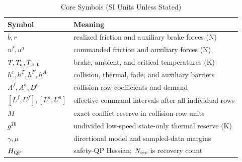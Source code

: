 \begin{table}[t]
\caption{Core Symbols (SI Units Unless Stated)}
\label{tab:nomenclature}
\centering\normalsize
\begin{tabular}{@{}>{\raggedright\arraybackslash}p{}>{\raggedright\arraybackslash}p{}@{}}
\toprule
Symbol & Meaning \\
\midrule
$b,r$ & realized friction and auxiliary brake forces (N) \\
$u^f,u^a$ & commanded friction and auxiliary forces (N) \\
$T,T_a,T_{\rm crit}$ & brake, ambient, and critical temperatures (K) \\
$h^c,h^T,h^F,h^A$ & collision, thermal, fade, and auxiliary barriers \\
$A^f,A^a,D^c$ & collision-row coefficients and demand \\
$[L^f,U^f],[L^a,U^a]$ & effective command intervals after all individual rows \\
$M$ & exact conflict reserve in collision-row units \\
$g^{T0}$ & undivided low-speed state-only thermal reserve (K) \\
$\gamma,\mu$ & directional model and sampled-data margins \\
$H_{\rm QP}$ & safety-QP Hessian; $N_{\rm rec}$ is recovery count \\
\bottomrule
\end{tabular}
\end{table}
